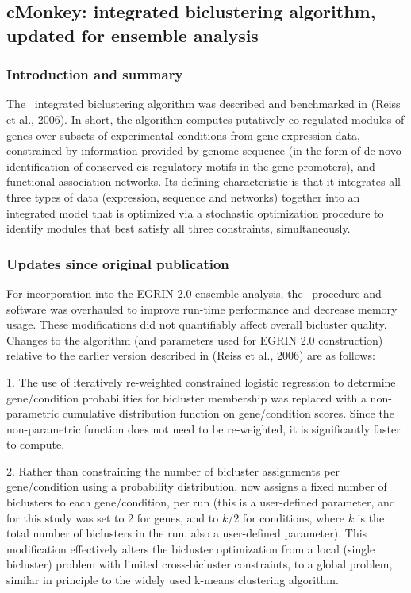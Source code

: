 \subsection{cMonkey: integrated biclustering algorithm, updated for ensemble analysis}

\subsubsection{Introduction and summary}

The \cm\ integrated biclustering algorithm was described and
benchmarked in (Reiss et al., 2006). In short, the algorithm computes
putatively co-regulated modules of genes over subsets of experimental
conditions from gene expression data, constrained by information
provided by genome sequence (in the form of de novo identification of
conserved cis-regulatory motifs in the gene promoters), and functional
association networks. Its defining characteristic is that it
integrates all three types of data (expression, sequence and networks)
together into an integrated model that is optimized via a stochastic
optimization procedure to identify modules that best satisfy all three
constraints, simultaneously.

\subsubsection{Updates since original publication}

For incorporation into the EGRIN 2.0 ensemble analysis, the \cm\
procedure and software was overhauled to improve run-time performance
and decrease memory usage. These modifications did not quantifiably
affect overall bicluster quality. Changes to the algorithm (and
parameters used for EGRIN 2.0 construction) relative to the earlier
version described in (Reiss et al., 2006) are as follows:

1. The use of iteratively re-weighted constrained logistic regression
to determine gene/condition probabilities for bicluster membership was
replaced with a non-parametric cumulative distribution function on
gene/condition scores. Since the non-parametric function does not need
to be re-weighted, it is significantly faster to compute.

2. Rather than constraining the number of bicluster assignments per
gene/condition using a probability distribution, \cm now assigns a
fixed number of biclusters to each gene/condition, per run (this is a
user-defined parameter, and for this study was set to 2 for genes, and
to $k/2$ for conditions, where $k$ is the total number of biclusters in
the run, also a user-defined parameter). This modification effectively
alters the bicluster optimization from a local (single bicluster)
problem with limited cross-bicluster constraints, to a global problem,
similar in principle to the widely used k-means clustering algorithm.


